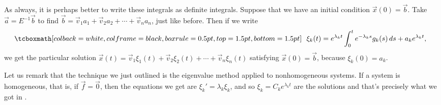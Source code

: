\medskip

As always,
it is perhaps better to write these integrals as definite integrals.  
Suppose that we have an initial condition $\vec{x}(0) = \vec{b}$.
Take $\vec{a} = E^{-1} \vec{b}$ to find
$\vec{b} = \vec{v}_1 a_1 + \vec{v}_2 a_2 + \cdots + \vec{v}_n a_n$,
just like before.
Then if we write 
\begin{equation*}
\mybxbg{~~
\xi_k(t) =  e^{\lambda_k t} 
\int_0^t e^{-\lambda_k s} g_k(s) \,ds + a_k e^{\lambda_k t} ,
~~}
\end{equation*}
we get the particular solution
$\vec{x}(t) =
\vec{v}_1 \xi_1(t) + 
\vec{v}_2 \xi_2(t) + \cdots +
\vec{v}_n \xi_n(t)$ satisfying $\vec{x}(0) = \vec{b}$,
because $\xi_k(0) = a_k$.

Let us remark that the technique we just outlined is the eigenvalue
method applied to nonhomogeneous systems.  If a system is homogeneous, that
is, if $\vec{f}=\vec{0}$, then the equations we get are
$\xi_k' = \lambda_k \xi_k$, and so $\xi_k = C_k e^{\lambda_k t}$ are the
solutions and that's precisely what we got in
.

